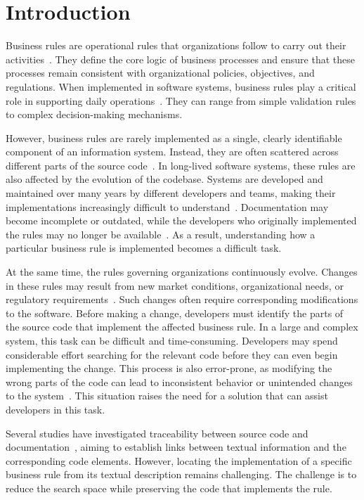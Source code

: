 \section{Introduction}

Business rules are operational rules that organizations follow to carry out their activities~\cite{Huan96a}. They define the core logic of business processes and ensure that these processes remain consistent with organizational policies, objectives, and regulations. When implemented in software systems, business rules play a critical role in supporting daily operations~\cite{Cose13a}. They can range from simple validation rules to complex decision-making mechanisms.

However, business rules are rarely implemented as a single, clearly identifiable component of an information system. Instead, they are often scattered across different parts of the source code~\cite{Cose12a}. In long-lived software systems, these rules are also affected by the evolution of the codebase. Systems are developed and maintained over many years by different developers and teams, making their implementations increasingly difficult to understand~\cite{Ayac26a}. Documentation may become incomplete or outdated, while the developers who originally implemented the rules may no longer be available~\cite{Cose13a}. As a result, understanding how a particular business rule is implemented becomes a difficult task.

At the same time, the rules governing organizations continuously evolve. Changes in these rules may result from new market conditions, organizational needs, or regulatory requirements~\cite{Chit19a}. Such changes often require corresponding modifications to the software. Before making a change, developers must identify the parts of the source code that implement the affected business rule. In a large and complex system, this task can be difficult and time-consuming. Developers may spend considerable effort searching for the relevant code before they can even begin implementing the change. This process is also error-prone, as modifying the wrong parts of the code can lead to inconsistent behavior or unintended changes to the system~\cite{Ayac26a}. This situation raises the need for a solution that can assist developers in this task. 

Several studies have investigated traceability between source code and documentation~\cite{Anto02b,Cao18a,Ali11a,Eaddy08a,Keim24a}, aiming to establish links between textual information and the corresponding code elements. However, locating the implementation of a specific business rule from its textual description remains challenging. The challenge is to reduce the search space while preserving the code that implements the rule.

